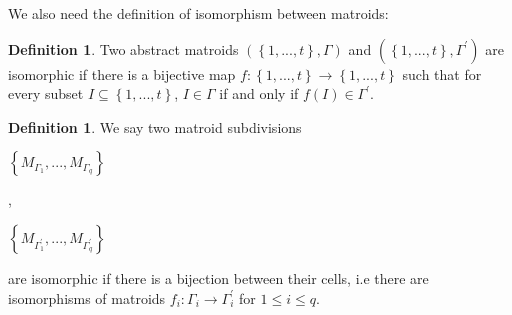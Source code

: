 \documentclass[12pt, reqno]{amsart}
\newtheorem{lemma}[theorem]{Lemma}
\theoremstyle{definition}
\newtheorem{definition}[theorem]{Definition}
\theoremstyle{remark}
\numberwithin{equation}{section}
\begin{document}
  
  We also need  the definition of isomorphism between matroids:
  
  \begin{definition}\label{isomat}
  	Two abstract matroids 
  	$(\left\{1,...,t\right\},\varGamma)$ and 
  	$(\left\{1,...,t\right\},\varGamma^\prime)$
  	are isomorphic if there is a bijective map 
  	$f:\left\{1,...,t\right\}\to \left\{1,...,t\right\}$
  	such that 
  	for every subset
  	$I\subseteq\left\{1,...,t\right\}$, 
  	$I\in \varGamma$
  	if and only if 
  	$f(I)\in \varGamma^\prime$.
  \end{definition}
  
  \begin{definition}
  	
  	
  	We say two matroid subdivisions
  	
  	\begin{center}
  	$\left\{M_{\Gamma_1},...,M_{\Gamma_q}\right\}$	
  		
  	\end{center}
  
  
  \begin{center}
  	,
  \end{center}	
  	
  	
  	
  	
  	
  	\begin{center}
  		$\left\{M_{\Gamma^\prime_1},...,M_{\Gamma^\prime_q}\right\}$	
  		
  	\end{center}
  	
  	
  	
  	
  	
  	
  	
  	 are isomorphic if there is a bijection between their cells, i.e
  	 there are isomorphisms of matroids
  	 	$f_i:\Gamma_i\to \Gamma_i^\prime$
  	  for
  	  $1\leq i\leq q$.
  	
  	
  \end{definition}
  
\end{document}
